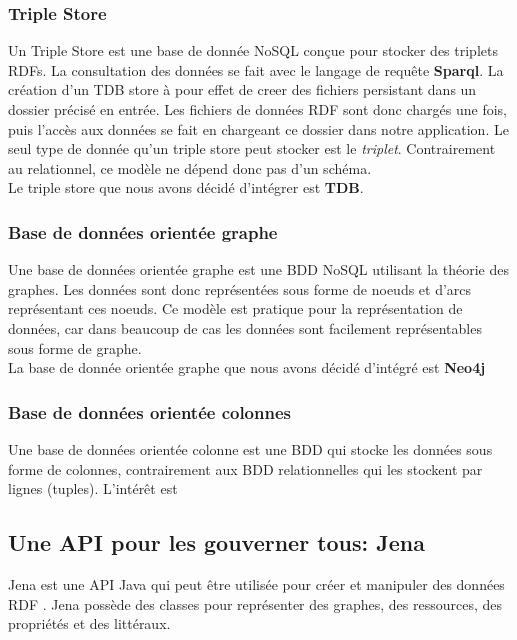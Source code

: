 \documentclass{article}
\begin{document}
\subsubsection{Triple Store}
Un Triple Store est une base de donnée NoSQL conçue pour stocker des triplets RDFs. La consultation des données se fait avec le langage de requête \textbf{Sparql}. 
La création d'un TDB store à pour effet de creer des fichiers persistant dans un dossier précisé en entrée. Les fichiers de données RDF sont donc chargés une fois, puis l'accès aux données se fait en chargeant ce dossier dans notre application. Le seul type de donnée qu'un triple store peut stocker est le \textit{triplet}. Contrairement au relationnel, ce modèle ne dépend donc pas d'un schéma.\\
Le triple store que nous avons décidé d'intégrer est \textbf{TDB}.
\subsubsection{Base de données orientée graphe}
Une base de données orientée graphe est une BDD NoSQL utilisant la théorie des graphes. Les données sont donc représentées sous forme de noeuds et d'arcs représentant ces noeuds. Ce modèle est pratique pour la représentation de données, car dans beaucoup de cas les données sont facilement représentables sous forme de graphe.\\
La base de donnée orientée graphe que nous avons décidé d'intégré est \textbf{Neo4j}
\subsubsection{Base de données orientée colonnes}
Une base de données orientée colonne est une BDD qui stocke les données sous forme de colonnes, contrairement aux BDD relationnelles qui les stockent par lignes (tuples). L'intérêt est



 
\subsection{Une API pour les gouverner tous: Jena}

Jena est une API Java qui peut être utilisée pour créer et manipuler des données RDF . Jena possède des classes pour représenter des graphes, des ressources, des propriétés et des littéraux.
\end{document}
